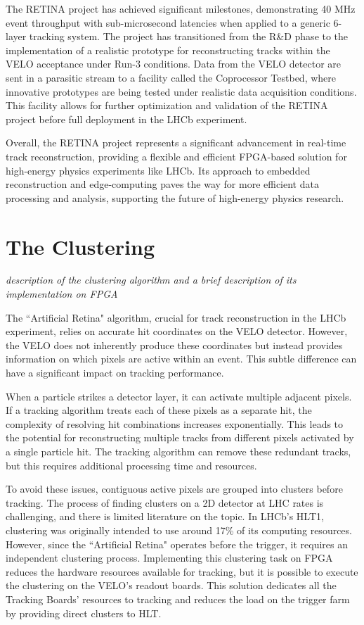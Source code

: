 The RETINA project has achieved significant milestones, demonstrating 40 MHz event throughput with sub-microsecond latencies when applied to a generic 6-layer tracking system. The project has transitioned from the R\&D phase to the implementation of a realistic prototype for reconstructing tracks within the VELO acceptance under Run-3 conditions. Data from the VELO detector are sent in a parasitic stream to a facility called the Coprocessor Testbed, where innovative prototypes are being tested under realistic data acquisition conditions. This facility allows for further optimization and validation of the RETINA project before full deployment in the LHCb experiment.

Overall, the RETINA project represents a significant advancement in real-time track reconstruction, providing a flexible and efficient FPGA-based solution for high-energy physics experiments like LHCb. Its approach to embedded reconstruction and edge-computing paves the way for more efficient data processing and analysis, supporting the future of high-energy physics research.

\section{The Clustering}
\textit{description of the clustering algorithm and a brief description of its implementation on FPGA\\
}

The ``Artificial Retina" algorithm, crucial for track reconstruction in the LHCb experiment, relies on accurate hit coordinates on the VELO detector. However, the VELO does not inherently produce these coordinates but instead provides information on which pixels are active within an event. This subtle difference can have a significant impact on tracking performance.

When a particle strikes a detector layer, it can activate multiple adjacent pixels. If a tracking algorithm treats each of these pixels as a separate hit, the complexity of resolving hit combinations increases exponentially. This leads to the potential for reconstructing multiple tracks from different pixels activated by a single particle hit. The tracking algorithm can remove these redundant tracks, but this requires additional processing time and resources.

To avoid these issues, contiguous active pixels are grouped into clusters before tracking. The process of finding clusters on a 2D detector at LHC rates is challenging, and there is limited literature on the topic. In LHCb's HLT1, clustering was originally intended to use around 17\% of its computing resources. However, since the ``Artificial Retina" operates before the trigger, it requires an independent clustering process. Implementing this clustering task on FPGA reduces the hardware resources available for tracking, but it is possible to execute the clustering on the VELO's readout boards. This solution dedicates all the Tracking Boards' resources to tracking and reduces the load on the trigger farm by providing direct clusters to HLT.

